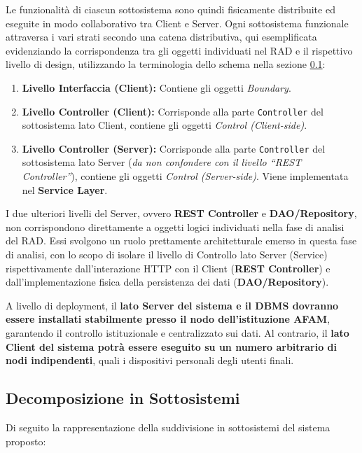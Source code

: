 Le funzionalità di ciascun sottosistema sono quindi fisicamente distribuite ed eseguite in modo collaborativo tra Client e Server. Ogni sottosistema funzionale attraversa i vari strati secondo una catena distributiva, qui esemplificata evidenziando la corrispondenza tra gli oggetti individuati nel RAD e il rispettivo livello di design, utilizzando la terminologia dello schema nella sezione \ref{scomposizione}:
\begin{enumerate}
    \item \textbf{Livello Interfaccia (Client):} Contiene gli oggetti \textit{Boundary}.
    \item \textbf{Livello Controller (Client):} Corrisponde alla parte \texttt{Controller} del sottosistema lato Client, contiene gli oggetti \textit{Control (Client-side)}.
    \item \textbf{Livello Controller (Server):} Corrisponde alla parte \texttt{Controller} del sottosistema lato Server (\textit{da non confondere con il livello ``REST Controller''}), contiene gli oggetti \textit{Control (Server-side)}. Viene implementata nel \textbf{Service Layer}.
\end{enumerate}

I due ulteriori livelli del Server, ovvero \textbf{REST Controller} e \textbf{DAO/Repository}, non corrispondono direttamente a oggetti logici individuati nella fase di analisi del RAD. Essi svolgono un ruolo prettamente architetturale emerso in questa fase di analisi, con lo scopo di isolare il livello di Controllo lato Server (Service) rispettivamente dall'interazione HTTP con il Client (\textbf{REST Controller}) e dall'implementazione fisica della persistenza dei dati (\textbf{DAO/Repository}).

A livello di deployment, il \textbf{lato Server del sistema e il DBMS dovranno essere installati stabilmente presso il nodo dell'istituzione AFAM}, garantendo il controllo istituzionale e centralizzato sui dati. Al contrario, il \textbf{lato Client del sistema potrà essere eseguito su un numero arbitrario di nodi indipendenti}, quali i dispositivi personali degli utenti finali.

\clearpage

\subsection{Decomposizione in Sottosistemi} \label{scomposizione}

Di seguito la rappresentazione della suddivisione in sottosistemi del sistema proposto:

